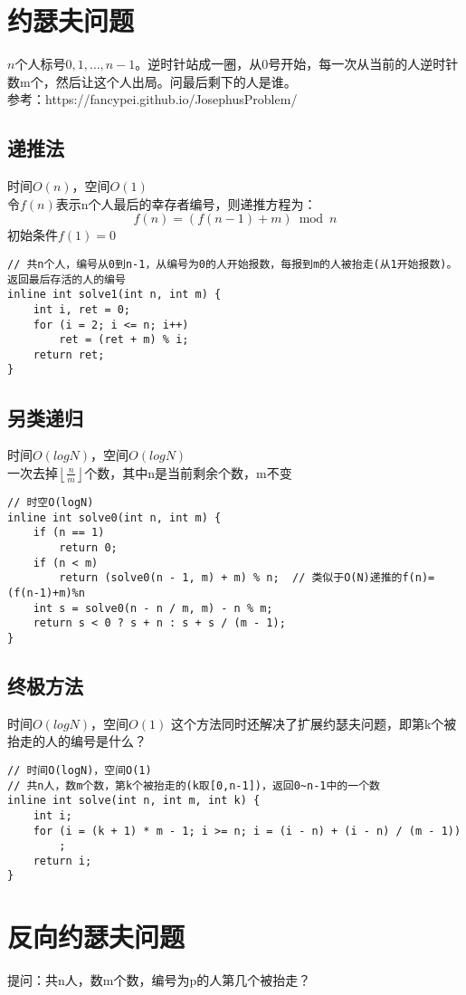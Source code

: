 \section{约瑟夫问题}
    $n$个人标号$0,1,\dots,n-1$。逆时针站成一圈，从0号开始，每一次从当前的人逆时针数m个，然后让这个人出局。问最后剩下的人是谁。\\
    参考：https://fancypei.github.io/JosephusProblem/
    \subsection{递推法}
        时间$O(n)$，空间$O(1)$\\
        令$f(n)$表示n个人最后的幸存者编号，则递推方程为：
        $$f(n)=(f(n-1)+m)\bmod n$$
        初始条件$f(1)=0$
\begin{lstlisting}
// 共n个人，编号从0到n-1，从编号为0的人开始报数，每报到m的人被抬走(从1开始报数)。返回最后存活的人的编号
inline int solve1(int n, int m) {
    int i, ret = 0;
    for (i = 2; i <= n; i++)
        ret = (ret + m) % i;
    return ret;
}
\end{lstlisting}
    \subsection{另类递归}
        时间$O(logN)$，空间$O(logN)$\\
        一次去掉$\left \lfloor \frac{n}{m} \right \rfloor$个数，其中n是当前剩余个数，m不变
\begin{lstlisting}
// 时空O(logN)
inline int solve0(int n, int m) {
    if (n == 1)
        return 0;
    if (n < m)
        return (solve0(n - 1, m) + m) % n;  // 类似于O(N)递推的f(n)=(f(n-1)+m)%n
    int s = solve0(n - n / m, m) - n % m;
    return s < 0 ? s + n : s + s / (m - 1);
}
\end{lstlisting}
    \subsection{终极方法}
        时间$O(logN)$，空间$O(1)$
        这个方法同时还解决了扩展约瑟夫问题，即第k个被抬走的人的编号是什么？
\begin{lstlisting}
// 时间O(logN)，空间O(1)
// 共n人，数m个数，第k个被抬走的(k取[0,n-1])，返回0~n-1中的一个数
inline int solve(int n, int m, int k) {
    int i;
    for (i = (k + 1) * m - 1; i >= n; i = (i - n) + (i - n) / (m - 1))
        ;
    return i;
}
\end{lstlisting}

\section{反向约瑟夫问题}
    提问：共n人，数m个数，编号为p的人第几个被抬走？
